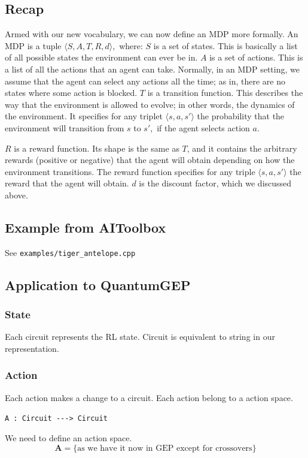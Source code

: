 \documentclass{article}
\begin{document}
\subsection{Recap}
Armed with our new vocabulary, we can now define an MDP more formally. An MDP is a tuple $\langle S, A, T, R, d\rangle,$ where:
$S$ is a set of states. This is basically a list of all possible states the environment can ever be in.
$A$ is a set of actions. This is a list of all the actions that an agent can take. Normally, in an MDP setting, we assume that the agent can select any actions all the time; as in, there are no states where some action is blocked.
$T$ is a transition function. This describes the way that the environment is allowed to evolve; in other words, the dynamics of the environment. 
It specifies for any triplet $\langle s, a, s'\rangle$ the probability that the environment will transition from $s$ to $s',$ if the agent selects action $a.$

$R$ is a reward function. Its shape is the same as $T$, and it contains the arbitrary rewards (positive or negative) 
that the agent will obtain depending on how the environment transitions. 
The reward function specifies for any triple $\langle s, a, s'\rangle$ the reward that the agent will obtain.
$d$ is the discount factor, which we discussed above.

\subsection{Example from AIToolbox}
See \verb!examples/tiger_antelope.cpp!

\subsection{Application to QuantumGEP}

\subsubsection{State}
Each circuit represents the RL state. Circuit is equivalent to string in our representation.

\subsubsection{Action}
Each action makes a change to a circuit.
Each action belong to a action space.

\verb!A : Circuit ---> Circuit!

We need to define an action space. 
\[
\mathbf{A} = \{\textrm{as we have it now in GEP except for crossovers}\}
\]
\end{document}
